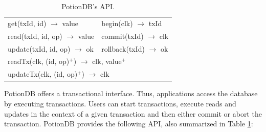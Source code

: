 \documentclass[sigplan,10pt]{acmart}
\newcommand{\code}[1]{\textsf{\small{#1}}}
\begin{document}
\begin{table}[t]
\center
	\begin{tabular}{ll} 
		\toprule
		\code{get(txId, id) $\rightarrow$ value}                  & \code{begin(clk) $\rightarrow$ txId}            \\
		\code{read(txId, id, op) $\rightarrow$ value}             & \code{commit(txId) $\rightarrow$ clk}          \\
		\code{update(txId, id, op) $\rightarrow$ ok}          & \code{rollback(txId) $\rightarrow$ ok}                        \\[4pt]
		\multicolumn{2}{l}{\code{readTx(clk, (id, op)$^+$) $\rightarrow$ clk, value$^+$}} \\
		\multicolumn{2}{l}{\code{updateTx(clk, (id, op)$^+$) $\rightarrow$ clk}} \\
		\bottomrule
	\end{tabular}
	\vspace{0.8em}
	\caption{PotionDB's API.}
	\label{table:PotionDB_API}
\end{table}

PotionDB offers a transactional interface.
Thus, applications access the database by executing transactions.
Users can start transactions, execute reads and updates in the context of a given transaction and then either commit or abort the transaction.
PotionDB provides the following API, also summarized in Table \ref{table:PotionDB_API}:
\end{document}
